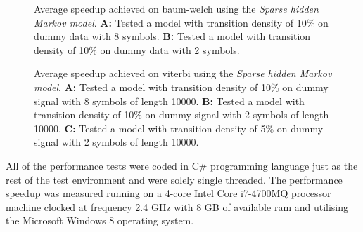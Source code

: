 \begin{figure}
	\centering
	\caption{Average speedup achieved on \gls{baum-welch} using the \emph{Sparse hidden Markov model}. \textbf{A:} Tested a model with transition density of 10\% on dummy data with 8 symbols. \textbf{B:} Tested a model with transition density of 10\% on dummy data with 2 symbols.}
	\label{sparseBWspeedup}
\end{figure}

\begin{figure}
	\centering
	\caption{Average speedup achieved on \gls{viterbi} using the \emph{Sparse hidden Markov model}. \textbf{A:} Tested a model with transition density of 10\% on dummy signal with 8 symbols of length 10000. \textbf{B:} Tested a model with transition density of 10\% on dummy signal with 2 symbols of length 10000. \textbf{C:} Tested a model with transition density of 5\% on dummy signal with 2 symbols of length 10000.}
	\label{sparseViterbispeedup}
\end{figure}

All of the performance tests were coded in C\# programming language just as the rest of the test environment and were solely single threaded. The performance speedup was measured running on a 4-core Intel Core i7-4700MQ processor machine clocked at frequency 2.4 GHz with 8 GB of available \gls{ram} and utilising the Microsoft Windows 8 operating system.

